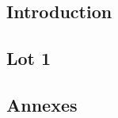 \documentclass[asi]{picInsa}
\title{\PTV{}}
\author{\Michel} %
\begin{document}
\couverture{}

 \informationsGenerales{}


\tableofcontents

\setcounter{chapter}{0}


\chapter{Introduction}
\label{introduction}


\chapter{Lot 1}
\label{lot1}



\begin{appendix}
\part*{Annexes}
\listoffigures
{}

\end{appendix}


\pageQuatriemeCouverture
\end{document}
